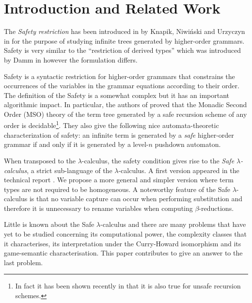 \documentclass{llncs}
\begin{document}
\section{Introduction and Related Work}

The \emph{Safety restriction} has been introduced in by Knapik, Niwi{\'n}ski and Urzyczyn in \cite{KNU02}
for the purpose of studying infinite trees generated by higher-order grammars.
Safety is very similar to the ``restriction of derived types'' which was introduced
by Damm in \cite{Dam82} however the formulation differs.

Safety is a syntactic restriction for higher-order grammars that
constrains the occurrences of the variables in the grammar
equations according to their order.
The definition of the Safety is a somewhat complex but it has an important algorithmic impact.
In particular, the authors of \cite{KNU02} proved that the Monadic Second
Order (MSO) theory of the term tree generated by a safe recursion
scheme of any order is decidable\footnote{In fact it has been shown
recently in \cite{OngLics2006} that it is also true for unsafe
recursion schemes.}. They also give the following nice automata-theoretic characterization of safety:
an infinite term is generated by a \emph{safe} higher-order grammar if and only if
it is generated by a level-$n$ pushdown automaton.


When transposed to the $\lambda$-calculus, the safety condition
gives rise to the \emph{Safe $\lambda$-calculus}, a strict
sub-language of the $\lambda$-calculus. A first version appeared in
the technical report \cite{safety-mirlong2004}. We propose a more
general and simpler version where term types are not required to be
homogeneous. A noteworthy feature of the Safe
$\lambda$-calculus is that no variable capture can occur when
performing substitution and therefore it is unnecessary to rename
variables when computing $\beta$-reductions.

Little is known about the Safe $\lambda$-calculus and there are many
problems that have yet to be studied concerning its
computational power, the complexity classes that it characterises,
its interpretation under the Curry-Howard isomorphism and its
game-semantic characterisation. This paper contributes to give an
answer to the last problem.


\end{document}
